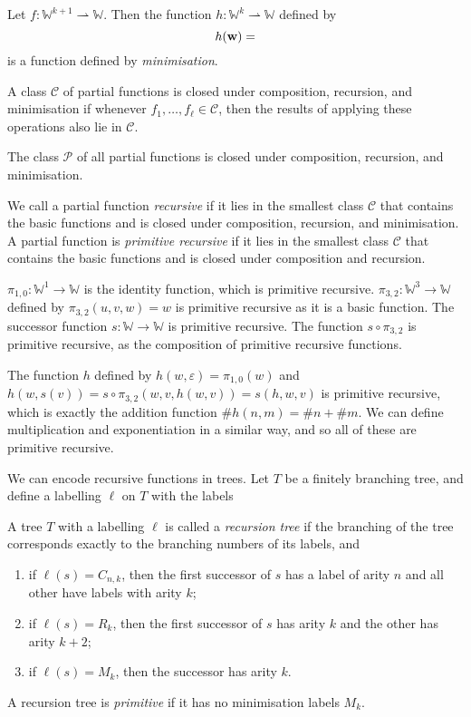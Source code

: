 Let \( f \colon \mathbb W^{k+1} \rightharpoonup \mathbb W \).
Then the function \( h \colon \mathbb W^k \rightharpoonup \mathbb W \) defined by
\[ h(\vb w) = \]
is a function defined by \emph{minimisation}.
\begin{definition}
	A class \( \mathcal C \) of partial functions is closed under composition, recursion, and minimisation if whenever \( f_1, \dots, f_\ell \in \mathcal C \), then the results of applying these operations also lie in \( \mathcal C \).
\end{definition}
\begin{remark}
	The class \( \mathcal P \) of all partial functions is closed under composition, recursion, and minimisation.
\end{remark}
\begin{definition}
	We call a partial function \emph{recursive} if it lies in the smallest class \( \mathcal C \) that contains the basic functions and is closed under composition, recursion, and minimisation.
	A partial function is \emph{primitive recursive} if it lies in the smallest class \( \mathcal C \) that contains the basic functions and is closed under composition and recursion.
\end{definition}
\begin{example}
	\( \pi_{1,0} \colon \mathbb W^1 \to \mathbb W \) is the identity function, which is primitive recursive.
	\( \pi_{3,2} \colon \mathbb W^3 \to \mathbb W \) defined by \( \pi_{3,2}(u,v,w) = w \) is primitive recursive as it is a basic function.
	The successor function \( s \colon \mathbb W \to \mathbb W \) is primitive recursive.
	The function \( s \circ \pi_{3,2} \) is primitive recursive, as the composition of primitive recursive functions.

	The function \( h \) defined by \( h(w,\varepsilon) = \pi_{1,0}(w) \) and \( h(w,s(v)) = s \circ \pi_{3,2}(w,v,h(w,v)) = s(h,w,v) \) is primitive recursive, which is exactly the addition function \( \# h(n,m) = \# n + \# m \).
	We can define multiplication and exponentiation in a similar way, and so all of these are primitive recursive.
\end{example}
We can encode recursive functions in trees.
Let \( T \) be a finitely branching tree, and define a labelling \( \ell \) on \( T \) with the labels
\begin{definition}
	A tree \( T \) with a labelling \( \ell \) is called a \emph{recursion tree} if the branching of the tree corresponds exactly to the branching numbers of its labels, and
	\begin{enumerate}
		\item if \( \ell(s) = C_{n,k} \), then the first successor of \( s \) has a label of arity \( n \) and all other have labels with arity \( k \);
		\item if \( \ell(s) = R_k \), then the first successor of \( s \) has arity \( k \) and the other has arity \( k + 2 \);
		\item if \( \ell(s) = M_k \), then the successor has arity \( k \).
	\end{enumerate}
	A recursion tree is \emph{primitive} if it has no minimisation labels \( M_k \).
\end{definition}
